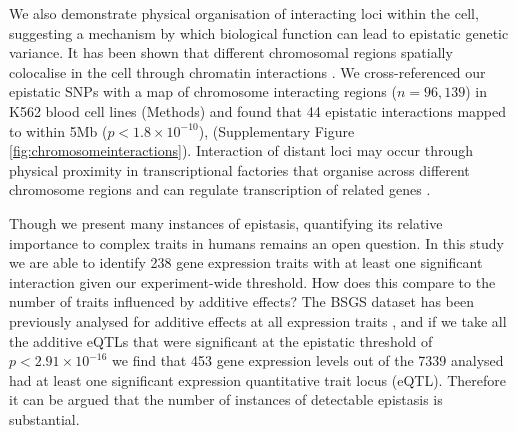 \documentclass{article}
\begin{document}
We also demonstrate physical organisation of interacting loci within the cell, suggesting a mechanism by which biological function can lead to epistatic genetic variance. It has been shown that different chromosomal regions spatially colocalise in the cell through chromatin interactions \cite{Lieberman-Aiden2009}. We cross-referenced our epistatic SNPs with a map of chromosome interacting regions ($n = 96,139$) in K562 blood cell lines \cite{Lan2012} (Methods) and found that 44 epistatic interactions mapped to within 5Mb ($p < 1.8 \times 10^{-10}$), (Supplementary Figure \ref{fig:chromosomeinteractions}). Interaction of distant loci may occur through physical proximity in transcriptional factories that organise across different chromosome regions and can regulate transcription of related genes \cite{Osborne2004, Rieder2012}.


Though we present many instances of epistasis, quantifying its relative importance to complex traits in humans remains an open question. In this study we are able to identify 238 gene expression traits with at least one significant interaction given our experiment-wide threshold. How does this compare to the number of traits influenced by additive effects? The BSGS dataset has been previously analysed for additive effects at all expression traits \cite{Powell2012}, and if we take all the additive eQTLs that were significant at the epistatic threshold of $p < 2.91 \times 10^{-16}$ we find that 453 gene expression levels out of the 7339 analysed had at least one significant expression quantitative trait locus (eQTL). Therefore it can be argued that the number of instances of detectable epistasis is substantial.
\end{document}
